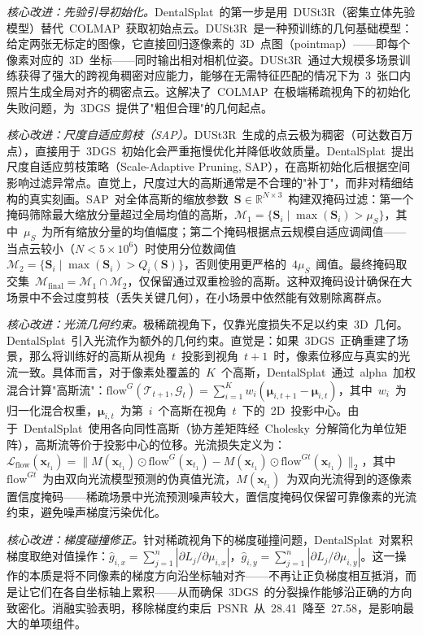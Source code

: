 \textit{核心改进：先验引导初始化。}DentalSplat~的第一步是用~DUSt3R（密集立体先验模型）替代~COLMAP~获取初始点云。DUSt3R~是一种预训练的几何基础模型：给定两张无标定的图像，它直接回归逐像素的~3D~点图（pointmap）——即每个像素对应的~3D~坐标——同时输出相对相机位姿。DUSt3R~通过大规模多场景训练获得了强大的跨视角稠密对应能力，能够在无需特征匹配的情况下为~3~张口内照片生成全局对齐的稠密点云。这解决了~COLMAP~在极端稀疏视角下的初始化失败问题，为~3DGS~提供了"粗但合理"的几何起点。

\textit{核心改进：尺度自适应剪枝（SAP）。}DUSt3R~生成的点云极为稠密（可达数百万点），直接用于~3DGS~初始化会严重拖慢优化并降低收敛质量。DentalSplat~提出尺度自适应剪枝策略（Scale-Adaptive Pruning, SAP），在高斯初始化后根据空间影响过滤异常点。直觉上，尺度过大的高斯通常是不合理的"补丁"，而非对精细结构的真实刻画。SAP~对全体高斯的缩放参数~$\mathbf{S} \in \mathbb{R}^{N \times 3}$~构建双掩码过滤：第一个掩码筛除最大缩放分量超过全局均值的高斯，$\mathcal{M}_1 = \{\mathbf{S}_i \mid \max(\mathbf{S}_i) > \mu_S\}$，其中~$\mu_S$~为所有缩放分量的均值幅度；第二个掩码根据点云规模自适应调阈值——当点云较小（$N < 5 \times 10^6$）时使用分位数阈值~$\mathcal{M}_2 = \{\mathbf{S}_i \mid \max(\mathbf{S}_i) > Q_i(\mathbf{S})\}$，否则使用更严格的~$4\mu_S$~阈值。最终掩码取交集~$\mathcal{M}_{\text{final}} = \mathcal{M}_1 \cap \mathcal{M}_2$，仅保留通过双重检验的高斯。这种双掩码设计确保在大场景中不会过度剪枝（丢失关键几何），在小场景中依然能有效剔除离群点。

\textit{核心改进：光流几何约束。}极稀疏视角下，仅靠光度损失不足以约束~3D~几何。DentalSplat~引入光流作为额外的几何约束。直觉是：如果~3DGS~正确重建了场景，那么将训练好的高斯从视角~$t$~投影到视角~$t+1$~时，像素位移应与真实的光流一致。具体而言，对于像素处覆盖的~$K$~个高斯，DentalSplat~通过~alpha~加权混合计算"高斯流"：$\text{flow}^G(\mathcal{T}_{t+1}, \mathcal{G}_t) = \sum_{i=1}^{K} w_i (\boldsymbol{\mu}_{i,t+1} - \boldsymbol{\mu}_{i,t})$，其中~$w_i$~为归一化混合权重，$\boldsymbol{\mu}_{i,t}$~为第~$i$~个高斯在视角~$t$~下的~2D~投影中心。由于~DentalSplat~使用各向同性高斯（协方差矩阵经~Cholesky~分解简化为单位矩阵），高斯流等价于投影中心的位移。光流损失定义为：$\mathcal{L}_{\text{flow}}(\mathbf{x}_{t_1}) = \|M(\mathbf{x}_{t_1}) \odot \text{flow}^G(\mathbf{x}_{t_1}) - M(\mathbf{x}_{t_1}) \odot \text{flow}^{Gt}(\mathbf{x}_{t_1})\|_2$，其中~$\text{flow}^{Gt}$~为由双向光流模型预测的伪真值光流，$M(\mathbf{x}_{t_1})$~为双向光流得到的逐像素置信度掩码——稀疏场景中光流预测噪声较大，置信度掩码仅保留可靠像素的光流约束，避免噪声梯度污染优化。

\textit{核心改进：梯度碰撞修正。}针对稀疏视角下的梯度碰撞问题，DentalSplat~对累积梯度取绝对值操作：$\hat{g}_{i,x} = \sum_{j=1}^{n} |\partial L_j / \partial \mu_{i,x}|$，$\hat{g}_{i,y} = \sum_{j=1}^{n} |\partial L_j / \partial \mu_{i,y}|$。这一操作的本质是将不同像素的梯度方向沿坐标轴对齐——不再让正负梯度相互抵消，而是让它们在各自坐标轴上累积——从而确保~3DGS~的分裂操作能够沿正确的方向致密化。消融实验表明，移除梯度约束后~PSNR~从~28.41~降至~27.58，是影响最大的单项组件。

